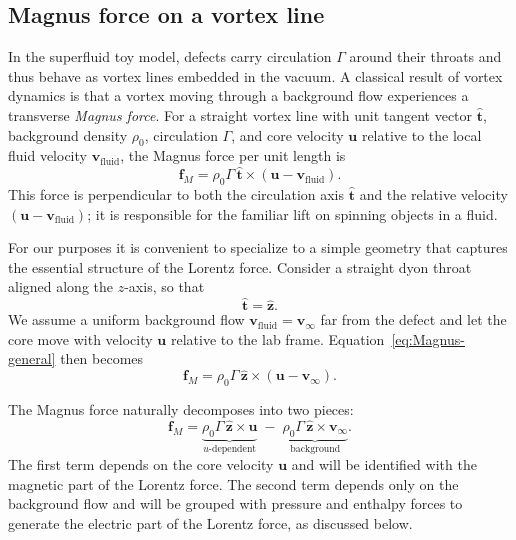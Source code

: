 \documentclass[11pt]{article}
\newcommand{\vfluid}{\mathbf{v}_{\mathrm{fluid}}}
\begin{document}
\subsection{Magnus force on a vortex line}

In the superfluid toy model, defects carry circulation $\Gamma$ around their throats and thus behave as vortex lines embedded in the vacuum.  A classical result of vortex dynamics is that a vortex moving through a background flow experiences a transverse \emph{Magnus force}.  For a straight vortex line with unit tangent vector $\hat{\mathbf{t}}$, background density $\rho_0$, circulation $\Gamma$, and core velocity $\mathbf{u}$ relative to the local fluid velocity $\vfluid$, the Magnus force per unit length is
\begin{equation}
\mathbf{f}_M
= \rho_0 \Gamma\,\hat{\mathbf{t}} \times (\mathbf{u} - \vfluid).
\label{eq:Magnus-general}
\end{equation}
This force is perpendicular to both the circulation axis $\hat{\mathbf{t}}$ and the relative velocity $(\mathbf{u}-\vfluid)$; it is responsible for the familiar lift on spinning objects in a fluid.

For our purposes it is convenient to specialize to a simple geometry that captures the essential structure of the Lorentz force.  Consider a straight dyon throat aligned along the $z$-axis, so that
\begin{equation}
\hat{\mathbf{t}} = \hat{\mathbf{z}}.
\end{equation}
We assume a uniform background flow $\vfluid = \mathbf{v}_\infty$ far from the defect and let the core move with velocity $\mathbf{u}$ relative to the lab frame.  Equation~\eqref{eq:Magnus-general} then becomes
\begin{equation}
\mathbf{f}_M
= \rho_0 \Gamma\,\hat{\mathbf{z}} \times (\mathbf{u} - \mathbf{v}_\infty).
\label{eq:Magnus-straight}
\end{equation}

The Magnus force naturally decomposes into two pieces:
\begin{equation}
\mathbf{f}_M
= \underbrace{\rho_0 \Gamma\,\hat{\mathbf{z}} \times \mathbf{u}}_{\text{$u$-dependent}}
 \;-\;
 \underbrace{\rho_0 \Gamma\,\hat{\mathbf{z}} \times \mathbf{v}_\infty}_{\text{background}}.
\label{eq:Magnus-decomp}
\end{equation}
The first term depends on the core velocity $\mathbf{u}$ and will be identified with the magnetic part of the Lorentz force.  The second term depends only on the background flow and will be grouped with pressure and enthalpy forces to generate the electric part of the Lorentz force, as discussed below.
\end{document}
